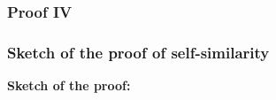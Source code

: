 \subsubsection*{Proof IV}
\begin{frame}
	\frametitle{Sketch of the proof of self-similarity}
	\textbf{Sketch of the proof:}\\
	\begin{columns}
	\begin{figure}[ht]
\centering
{
\resizebox{.9\columnwidth}{!}{
}
\label{fig:SS1}}
\end{figure}
	\begin{figure}[ht]
\centering
{
\resizebox{1\columnwidth}{!}{
}
\label{fig:SS2}}
\end{figure}
	\begin{figure}[ht]
\centering
{
\resizebox{.9\columnwidth}{!}{
}
\label{fig:SS3}}
\end{figure}

\end{columns}
\end{frame}
